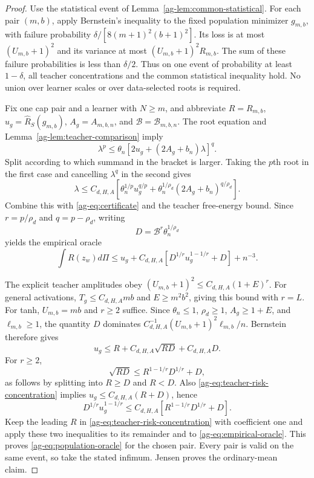 \begin{proof}
Use the statistical event of Lemma~\ref{ag-lem:common-statistical}. For each pair $(m,b)$, apply Bernstein's inequality to the fixed population minimizer $g_{m,b}$, with failure probability $\delta/[8(m+1)^2(b+1)^2]$. Its loss is at most $(U_{m,b}+1)^2$ and its variance at most $(U_{m,b}+1)^2R_{m,b}$. The sum of these failure probabilities is less than $\delta/2$. Thus on one event of probability at least $1-\delta$, all teacher concentrations and the common statistical inequality hold. No union over learner scales or over data-selected roots is required.

Fix one cap pair and a learner with $N\ge m$, and abbreviate $R=R_{m,b}$, $u_g=\widehat R_S(g_{m,b})$, $A_g=A_{m,b,n}$, and $\mathcal B=\mathcal B_{m,b,n}$. The root equation and Lemma~\ref{ag-lem:teacher-comparison} imply
\[
 \lambda^p\le\theta_n[2u_g+(2A_g+b_n)\lambda]^q.
\]
Split according to which summand in the bracket is larger. Taking the $p$th root in the first case and cancelling $\lambda^q$ in the second gives
\begin{equation}
 \lambda\le C_{d,H,A}\left[
 \theta_n^{1/p}u_g^{q/p}
 +\theta_n^{1/\rho_d}(2A_g+b_n)^{q/\rho_d}\right].
 \label{ag-eq:root-comparison}
\end{equation}
Combine this with \eqref{ag-eq:certificate} and the teacher free-energy bound. Since $r=p/\rho_d$ and $q=p-\rho_d$, writing
\[
 D=\mathcal B^r\theta_n^{1/\rho_d}
\]
yields the empirical oracle
\begin{equation}
 \int R(z_w)d\Pi\le u_g+C_{d,H,A}
       [D^{1/r}u_g^{1-1/r}+D]+n^{-3}.
 \label{ag-eq:empirical-oracle}
\end{equation}

The explicit teacher amplitudes obey
$(U_{m,b}+1)^2\le C_{d,H,A}(1+E)^r$.
For general activations, $T_g\le C_{d,H,A}mb$ and $E\ge m^2b^2$, giving this bound with $r=L$. For tanh, $U_{m,b}=mb$ and $r\ge2$ suffice. Since $\theta_n\le1$, $\rho_d\ge1$, $A_g\ge1+E$, and $\ell_{m,b}\ge1$, the quantity $D$ dominates
$C^{-1}_{d,H,A}(U_{m,b}+1)^2\ell_{m,b}/n$.
Bernstein therefore gives
\begin{equation}
 u_g\le R+C_{d,H,A}\sqrt{RD}+C_{d,H,A}D.
 \label{ag-eq:teacher-risk-concentration}
\end{equation}
For $r\ge2$,
\[
 \sqrt{RD}\le R^{1-1/r}D^{1/r}+D,
\]
as follows by splitting into $R\ge D$ and $R<D$. Also \eqref{ag-eq:teacher-risk-concentration} implies $u_g\le C_{d,H,A}(R+D)$, hence
\[
 D^{1/r}u_g^{1-1/r}\le C_{d,H,A}
                  [R^{1-1/r}D^{1/r}+D].
\]
Keep the leading $R$ in \eqref{ag-eq:teacher-risk-concentration} with coefficient one and apply these two inequalities to its remainder and to \eqref{ag-eq:empirical-oracle}. This proves \eqref{ag-eq:population-oracle} for the chosen pair. Every pair is valid on the same event, so take the stated infimum. Jensen proves the ordinary-mean claim.
\end{proof}

